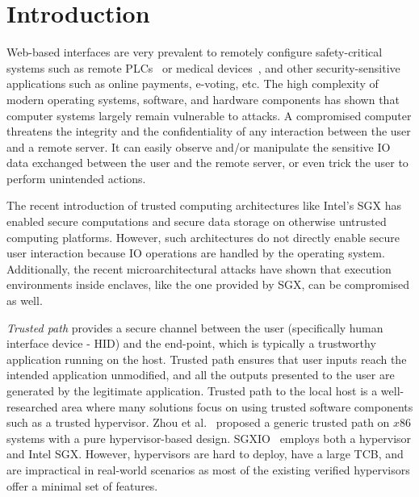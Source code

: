 \section{Introduction}
\label{sec:intro}

Web-based interfaces are very prevalent to remotely configure safety-critical systems such as remote PLCs~\cite{controlbyweb,webplc,koyo} or medical devices~\cite{medicalDevice}, and other security-sensitive applications such as online payments, e-voting, etc. The high complexity of modern operating systems, software, and hardware components has shown that computer systems largely remain vulnerable to attacks. A compromised computer threatens the integrity and the confidentiality of any interaction between the user and a remote server. It can easily observe and/or manipulate the sensitive IO data exchanged between the user and the remote server, or even trick the user to perform unintended actions. 

The recent introduction of trusted computing architectures like Intel's SGX has enabled secure computations and secure data storage on otherwise untrusted computing platforms. However, such architectures do not directly enable secure user interaction because IO operations are handled by the operating system. Additionally, the recent microarchitectural attacks have shown that execution environments inside enclaves, like the one provided by SGX, can be compromised as well.


\emph{Trusted path} provides a secure channel between the user (specifically human interface device - HID) and the end-point, which is typically a trustworthy application running on the host. Trusted path ensures that user inputs reach the intended application unmodified, and all the outputs presented to the user are generated by the legitimate application. Trusted path to the local host is a well-researched area where many solutions focus on using trusted software components such as a trusted hypervisor. Zhou et al.~\cite{zhou2012building} proposed a generic trusted path on $x86$ systems with a pure hypervisor-based design. SGXIO~\cite{weiser2017sgxio} employs both a hypervisor and Intel SGX. However, hypervisors are hard to deploy, have a large TCB, and are impractical in real-world scenarios as most of the existing verified hypervisors offer a minimal set of features. 


